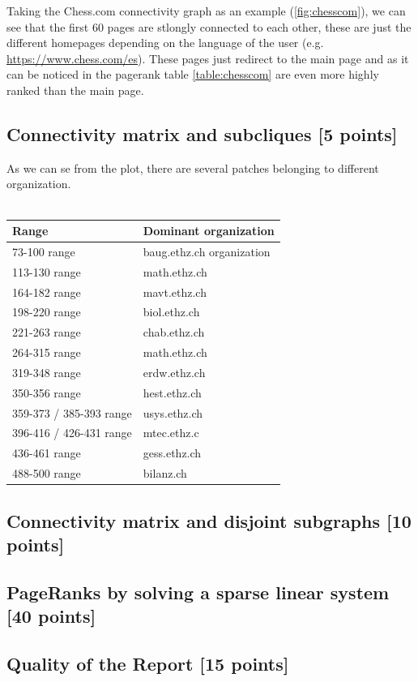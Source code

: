 \documentclass[unicode,11pt,a4paper,oneside,numbers=endperiod,openany]{scrartcl}
\begin{document}
Taking the Chess.com connectivity graph as an example (\ref{fig:chesscom}), we can see that the first 60 pages are stlongly connected to each other, 
these are just the different homepages depending on the language of the user (e.g. \url{https://www.chess.com/es}). 
These pages just redirect to the main page and as it can be noticed in the pagerank table \ref{table:chesscom} are even more highly ranked than the main page.


\subsection{Connectivity matrix and subcliques [5 points]}
As we can se from the plot, there are several patches belonging to different organization.
\\ \\
\begin{tabular}{|l|l|}
\hline
\textbf{Range} & \textbf{Dominant organization} \\
\hline
73-100 range & baug.ethz.ch organization\\
113-130 range & math.ethz.ch\\
164-182 range & mavt.ethz.ch\\
198-220 range & biol.ethz.ch\\
221-263 range & chab.ethz.ch\\
264-315 range & math.ethz.ch\\
319-348 range & erdw.ethz.ch\\
350-356 range & hest.ethz.ch\\
359-373 / 385-393 range & usys.ethz.ch\\
396-416 / 426-431 range  & mtec.ethz.c\\
436-461 range & gess.ethz.ch\\
488-500 range & bilanz.ch \\
\hline
\end{tabular}
\subsection{Connectivity matrix and disjoint subgraphs [10 points]}

\subsection{PageRanks by solving a sparse linear system [40 points]}

\subsection{Quality of the Report [15 points]}
\end{document}
